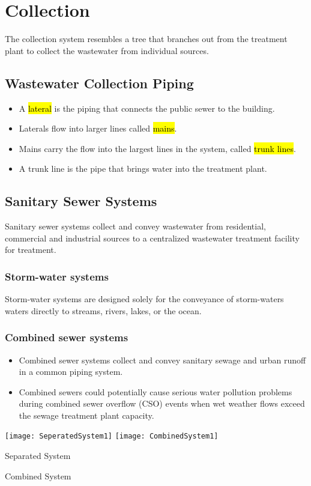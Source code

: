 \documentclass{article}
\begin{document}
\newpage
\section{Collection}	
The collection system resembles a tree that branches out from the treatment plant to collect the wastewater from individual sources.

\subsection{Wastewater Collection Piping}	
	\begin{itemize}
		\item A \hl{lateral} is the piping that connects the public sewer to the building. 
		\item Laterals flow into larger lines called \hl{mains}.
		\item Mains carry the flow into the largest lines in the system, called \hl{trunk lines}. 
		\item A trunk line is the pipe that brings water into the treatment plant.
	\end{itemize}
\subsection{Sanitary Sewer Systems}

Sanitary sewer systems collect and convey wastewater from residential, commercial and industrial sources to a centralized wastewater treatment facility for treatment. 

\subsubsection{Storm-water systems}

Storm-water systems are designed solely for the conveyance of storm-waters waters directly to streams, rivers, lakes, or the ocean.
 
\subsubsection{Combined sewer systems}
\begin{itemize}
\item Combined sewer systems collect and convey sanitary sewage and urban runoff in a common piping system.
\item Combined sewers could potentially cause serious water pollution problems during combined sewer overflow (CSO) events when wet weather flows exceed the sewage treatment plant capacity.
	\end{itemize}
\begin{center}
\texttt{[image: SeperatedSystem1]} \hspace{1 cm} \texttt{[image: CombinedSystem1]}
\end{center}
			\hspace{2.6cm} Separated System \hspace{3.2cm} \parbox{\textwidth}{Combined System}\\
\end{document}
